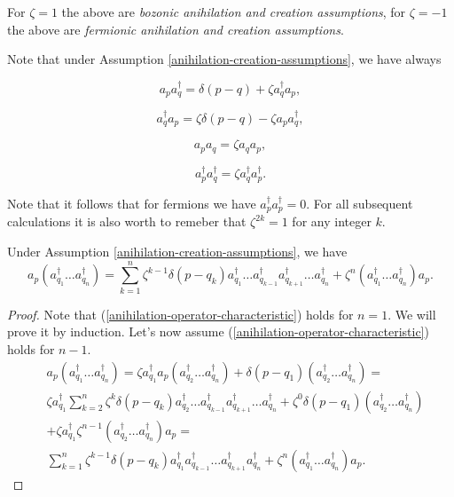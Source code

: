 \documentclass[main.tex]{subfiles}
\begin{document}
For $\zeta = 1$ the above are \textit{bozonic anihilation and creation assumptions}, for $\zeta = -1$ the above are \textit{fermionic anihilation and creation assumptions}.

Note that under Assumption \ref{anihilation-creation-assumptions}, we have always

\begin{equation}
a_p a_{q}^\dagger = \delta(p - q) + \zeta a_{q}^\dagger a_p,
\end{equation}

\begin{equation}
a_{q}^\dagger a_p = \zeta \delta(p - q) - \zeta a_p a_{q}^\dagger,
\end{equation}

\begin{equation}
a_p a_q = \zeta a_q a_p,
\end{equation}

\begin{equation}
a^\dagger_p a^\dagger_q = \zeta a^\dagger_q a^\dagger_p.
\end{equation}  

Note that it follows that for fermions we have $a^\dagger_p a^\dagger_p = 0$. For all subsequent calculations it is also worth to remeber that $\zeta^{2k} = 1$ for any integer $k$.

\begin{proposition}
Under Assumption \ref{anihilation-creation-assumptions}, we have
\begin{equation}
\label{anihilation-operator-characteristic}
a_p (a_{q_1}^\dagger \dots a_{q_n}^\dagger) = \sum_{k=1}^n \zeta^{k - 1} \delta(p - q_k) a_{q_1}^\dagger \dots a_{q_{k - 1}}^\dagger a_{q_{k + 1}}^\dagger  \dots  a_{q_n}^\dagger + \zeta^n( a_{q_1}^\dagger \dots a_{q_n}^\dagger)a_p.
\end{equation}
\end{proposition}
\begin{proof}
Note that (\ref{anihilation-operator-characteristic}) holds for $n = 1$. We will prove it by induction. Let's now assume (\ref{anihilation-operator-characteristic}) holds for $n - 1$.
\begin{align*}
& a_p (a_{q_1}^\dagger \dots a_{q_n}^\dagger)=
\zeta a_{q_1}^\dagger a_p (a_{q_2}^\dagger \dots a_{q_n}^\dagger) + \delta(p - q_1) (a_{q_2}^\dagger \dots a_{q_n}^\dagger)= \\
& \zeta a_{q_1}^\dagger\sum_{k=2}^n\zeta^k \delta(p - q_k) a_{q_2}^\dagger \dots a_{q_{k - 1}}^\dagger a_{q_{k + 1}}^\dagger  \dots a_{q_n}^\dagger + \zeta^0 \delta(p - q_1) (a_{q_2}^\dagger \dots a_{q_n}^\dagger) \\
& + \zeta a_{q_1}^\dagger \zeta^{n - 1}(a_{q_2}^\dagger \dots a_{q_n}^\dagger)a_p = \\
& \sum_{k=1}^n \zeta^{k - 1} \delta(p - q_k) a_{q_1}^\dagger a_{q_{k - 1}}^\dagger \dots a_{q_{k + 1}}^\dagger a_{q_n}^\dagger + \zeta^n( a_{q_1}^\dagger \dots a_{q_n}^\dagger)a_p.
\end{align*} 
\end{proof}
\end{document}
